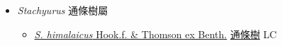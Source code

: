 
  \begin{itemize}
 \item[] \textit{Stachyurus} 通條樹屬
                    
  \begin{itemize}
        \item[] \href{http://www.theplantlist.org/tpl1.1/search?q=Stachyurus+himalaicus}{\textit{S. himalaicus} Hook.f. \& Thomson ex Benth.}   \href{\detokenize{http://taibnet.sinica.edu.tw/chi/taibnet_species_list.php?T2=通條樹&T2_new_value=true&fr=y}}{通條樹} LC
  \end{itemize}
  \end{itemize}
